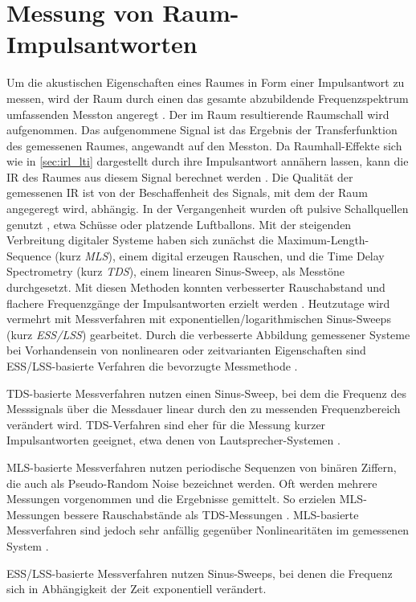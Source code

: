 \section{Messung von Raum-Impulsantworten}
\label{sec:ir_msrmt}
Um die akustischen Eigenschaften eines Raumes in Form einer Impulsantwort zu messen, wird der Raum
durch einen das gesamte abzubildende Frequenzspektrum umfassenden Messton angeregt \cite{smpm2001}.
Der im Raum resultierende Raumschall wird aufgenommen.
Das aufgenommene Signal ist das Ergebnis der Transferfunktion des gemessenen Raumes,
angewandt auf den Messton. Da Raumhall-Effekte sich wie in \ref{sec:irl_lti} dargestellt durch ihre Impulsantwort annähern lassen, kann die IR des Raumes
aus diesem Signal berechnet werden \cite{novak2016}. Die Qualität der gemessenen IR ist von der Beschaffenheit des Signals, mit dem der Raum angegeregt wird, abhängig.
In der Vergangenheit wurden oft pulsive Schallquellen genutzt \cite{farina2007b}, etwa Schüsse oder platzende Luftballons. Mit der steigenden Verbreitung digitaler Systeme
haben sich zunächst die Maximum-Length-Sequence (kurz \textit{MLS}), einem digital erzeugen Rauschen, und die Time Delay Spectrometry (kurz \textit{TDS}),
einem linearen Sinus-Sweep, als Messtöne durchgesetzt. Mit diesen Methoden konnten verbesserter Rauschabstand und flachere Frequenzgänge der Impulsantworten erzielt werden \cite{farina2007b}.
Heutzutage wird vermehrt mit Messverfahren mit exponentiellen/logarithmischen Sinus-Sweeps (kurz \textit{ESS/LSS}) gearbeitet.
Durch die verbesserte Abbildung gemessener Systeme bei Vorhandensein von nonlinearen oder zeitvarianten Eigenschaften sind ESS/LSS-basierte Verfahren die bevorzugte Messmethode \cite{farina2007b}.

TDS-basierte Messverfahren nutzen einen Sinus-Sweep, bei dem die Frequenz des Messsignals über die Messdauer linear durch den zu messenden
Frequenzbereich verändert wird. TDS-Verfahren sind eher für die Messung kurzer Impulsantworten geeignet, etwa denen von Lautsprecher-Systemen \cite{farina2000, holters2009}.

MLS-basierte Messverfahren nutzen periodische Sequenzen von binären Ziffern, die auch als Pseudo-Random Noise bezeichnet werden.
Oft werden mehrere Messungen vorgenommen und die Ergebnisse gemittelt. So erzielen MLS-Messungen bessere Rauschabstände als TDS-Messungen  \cite{rife1989}.
MLS-basierte Messverfahren sind jedoch sehr anfällig gegenüber Nonlinearitäten im gemessenen System \cite{holters2009}.

ESS/LSS-basierte Messverfahren nutzen Sinus-Sweeps, bei denen die Frequenz sich in Abhängigkeit der Zeit exponentiell verändert. 

